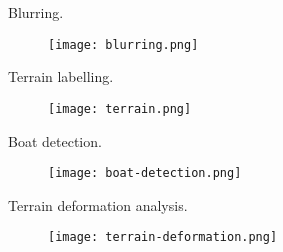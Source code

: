\begin{frame}
Blurring.
\begin{figure}
\centering
\texttt{[image: blurring.png]}
\end{figure}
\end{frame}


\begin{frame}
Terrain labelling.
\begin{figure}
\centering
\texttt{[image: terrain.png]}
\end{figure}
\end{frame}




\begin{frame}
Boat detection.
\begin{figure}
\centering
\texttt{[image: boat-detection.png]}
\end{figure}
\end{frame}


\begin{frame}
Terrain deformation analysis.
\begin{figure}
\centering
\texttt{[image: terrain-deformation.png]}
\end{figure}
\end{frame}


